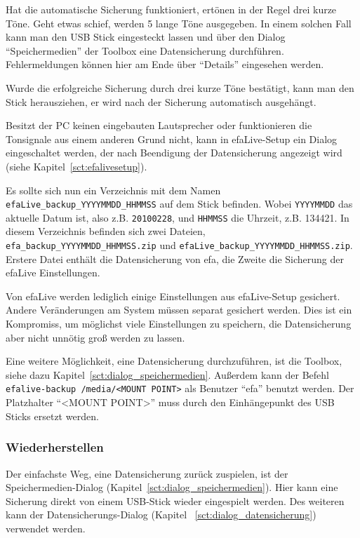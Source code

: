 \documentclass[a4paper,12pt,twoside]{article}
\begin{document}
Hat die automatische Sicherung funktioniert, ertönen in der Regel drei
kurze Töne. Geht etwas schief, werden 5 lange Töne ausgegeben. In einem
solchen Fall kann man den USB Stick eingesteckt lassen und über den
Dialog "`Speichermedien"' der Toolbox eine
Datensicherung durchführen. Fehlermeldungen können hier am Ende über
"`Details"' eingesehen werden.

Wurde die erfolgreiche Sicherung durch drei kurze Töne bestätigt, kann
man den Stick herausziehen, er wird nach der Sicherung automatisch
ausgehängt.

Besitzt der PC keinen eingebauten Lautsprecher oder funktionieren die
Tonsignale aus einem anderen Grund nicht, kann in efaLive-Setup ein
Dialog eingeschaltet werden, der nach Beendigung der Datensicherung
angezeigt wird (siehe Kapitel~\ref{sct:efalivesetup}).

Es sollte sich nun ein Verzeichnis mit dem Namen\\
\texttt{efaLive\_backup\_YYYYMMDD\_HHMMSS} auf dem
Stick befinden. Wobei \texttt{YYYYMMDD} das aktuelle Datum ist, also z.B.
\texttt{20100228}, und \texttt{HHMMSS} die Uhrzeit, z.B. 134421. In diesem Verzeichnis
befinden sich zwei Dateien,
\texttt{efa\_backup\_YYYYMMDD\_HHMMSS.zip} und
\texttt{efaLive\_backup\_YYYYMMDD\_HHMMSS.zip}.
Erstere Datei enthält die Datensicherung von efa, die Zweite die
Sicherung der efaLive Einstellungen.

Von efaLive werden lediglich einige Einstellungen aus efaLive-Setup
gesichert. Andere Veränderungen am System müssen separat gesichert
werden. Dies ist ein Kompromiss, um möglichst viele Einstellungen zu
speichern, die Datensicherung aber nicht unnötig groß werden zu lassen.

Eine weitere Möglichkeit, eine Datensicherung durchzuführen, ist die
Toolbox, siehe dazu Kapitel~\ref{sct:dialog_speichermedien}. Außerdem kann der Befehl
\texttt{efalive-backup /media/{\textless}MOUNT POINT{\textgreater}} 
als Benutzer "`efa"' benutzt werden. Der Platzhalter "`{\textless}MOUNT 
POINT{\textgreater}"' muss durch den Einhängepunkt des USB Sticks 
ersetzt werden.


\subsubsection{Wiederherstellen}
\label{sct:daten_wiederherstellen}
Der einfachste Weg, eine Datensicherung zurück zuspielen, ist der
Speichermedien-Dialog (Kapitel~\ref{sct:dialog_speichermedien}). Hier
kann eine Sicherung direkt von einem USB-Stick wieder eingespielt
werden. Des weiteren kann der Datensicherungs-Dialog (Kapitel
~\ref{sct:dialog_datensicherung}) verwendet werden.
\end{document}
